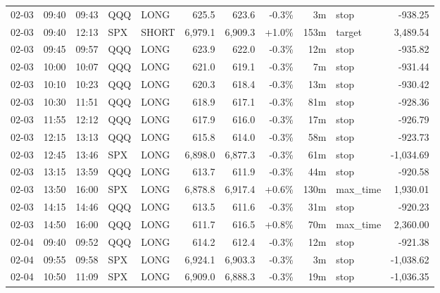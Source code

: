 \documentclass[11pt,a4paper,twoside]{article}
\begin{document}
\begin{center}
\begin{longtable}{>{\color{txtmain}}l l l l l r r r r >{\color{txtmain}}l r}
02-03 & 09:40 & 09:43 & QQQ & LONG & 625.5 & 623.6 & \textcolor{lossred}{-0.3\%} & 3m & stop & \textcolor{lossred}{-938.25} \\
02-03 & 09:40 & 12:13 & SPX & SHORT & 6,979.1 & 6,909.3 & \textcolor{wingreen}{+1.0\%} & 153m & target & \textcolor{wingreen}{3,489.54} \\
02-03 & 09:45 & 09:57 & QQQ & LONG & 623.9 & 622.0 & \textcolor{lossred}{-0.3\%} & 12m & stop & \textcolor{lossred}{-935.82} \\
02-03 & 10:00 & 10:07 & QQQ & LONG & 621.0 & 619.1 & \textcolor{lossred}{-0.3\%} & 7m & stop & \textcolor{lossred}{-931.44} \\
02-03 & 10:10 & 10:23 & QQQ & LONG & 620.3 & 618.4 & \textcolor{lossred}{-0.3\%} & 13m & stop & \textcolor{lossred}{-930.42} \\
02-03 & 10:30 & 11:51 & QQQ & LONG & 618.9 & 617.1 & \textcolor{lossred}{-0.3\%} & 81m & stop & \textcolor{lossred}{-928.36} \\
02-03 & 11:55 & 12:12 & QQQ & LONG & 617.9 & 616.0 & \textcolor{lossred}{-0.3\%} & 17m & stop & \textcolor{lossred}{-926.79} \\
02-03 & 12:15 & 13:13 & QQQ & LONG & 615.8 & 614.0 & \textcolor{lossred}{-0.3\%} & 58m & stop & \textcolor{lossred}{-923.73} \\
02-03 & 12:45 & 13:46 & SPX & LONG & 6,898.0 & 6,877.3 & \textcolor{lossred}{-0.3\%} & 61m & stop & \textcolor{lossred}{-1,034.69} \\
02-03 & 13:15 & 13:59 & QQQ & LONG & 613.7 & 611.9 & \textcolor{lossred}{-0.3\%} & 44m & stop & \textcolor{lossred}{-920.58} \\
02-03 & 13:50 & 16:00 & SPX & LONG & 6,878.8 & 6,917.4 & \textcolor{wingreen}{+0.6\%} & 130m & max\_time & \textcolor{wingreen}{1,930.01} \\
02-03 & 14:15 & 14:46 & QQQ & LONG & 613.5 & 611.6 & \textcolor{lossred}{-0.3\%} & 31m & stop & \textcolor{lossred}{-920.23} \\
02-03 & 14:50 & 16:00 & QQQ & LONG & 611.7 & 616.5 & \textcolor{wingreen}{+0.8\%} & 70m & max\_time & \textcolor{wingreen}{2,360.00} \\
02-04 & 09:40 & 09:52 & QQQ & LONG & 614.2 & 612.4 & \textcolor{lossred}{-0.3\%} & 12m & stop & \textcolor{lossred}{-921.38} \\
02-04 & 09:55 & 09:58 & SPX & LONG & 6,924.1 & 6,903.3 & \textcolor{lossred}{-0.3\%} & 3m & stop & \textcolor{lossred}{-1,038.62} \\
02-04 & 10:50 & 11:09 & SPX & LONG & 6,909.0 & 6,888.3 & \textcolor{lossred}{-0.3\%} & 19m & stop & \textcolor{lossred}{-1,036.35} \\

\end{longtable}
\end{center}
\end{document}
